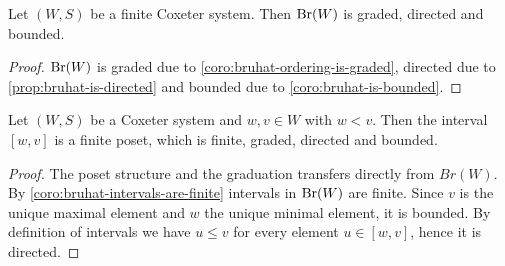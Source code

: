 \begin{theo}
	Let $(W,S)$ be a finite Coxeter system. Then $\operatorname{Br}(W)$ is graded, directed and bounded.

	\begin{proof}
		$\operatorname{Br}(W)$ is graded due to \ref{coro:bruhat-ordering-is-graded}, directed due to \ref{prop:bruhat-is-directed} and bounded due to \ref{coro:bruhat-is-bounded}.
	\end{proof}
\end{theo}

\begin{coro}
	Let $(W,S)$ be a Coxeter system and $w,v \in W$ with $w < v$. Then the interval $[w,v]$ is a finite poset, which is finite, graded, directed and bounded.

	\begin{proof}
		The poset structure and the graduation transfers directly from $Br(W)$. By \ref{coro:bruhat-intervals-are-finite} intervals in $\operatorname{Br}(W)$ are finite. Since $v$ is the unique maximal element and $w$ the unique minimal element, it is bounded. By definition of intervals we have $u \leq v$ for every element $u \in [w,v]$, hence it is directed.
	\end{proof}
\end{coro}